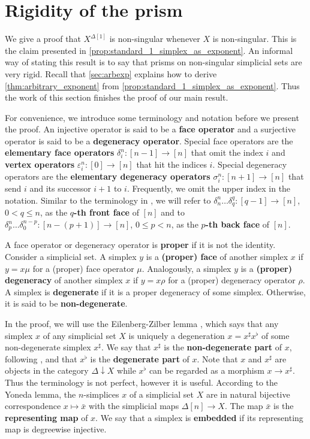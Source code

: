 

\section{Rigidity of the prism}
\label{sec:prism}

We give a proof that $X^{\Delta [1]}$ is non-singular whenever $X$ is non-singular. This is the claim presented in \cref{prop:standard_1_simplex_as_exponent}. An informal way of stating this result is to say that prisms on non-singular simplicial sets are very rigid. Recall that \cref{sec:arbexp} explains how to derive \cref{thm:arbitrary_exponent} from \cref{prop:standard_1_simplex_as_exponent}. Thus the work of this section finishes the proof of our main result.

For convenience, we introduce some terminology and notation before we present the proof. An injective operator is said to be a \textbf{face operator} and a surjective operator is said to be a \textbf{degeneracy operator}. Special face operators are the \textbf{elementary face operators} $\delta ^n_i:[n-1]\to [n]$ that omit the index $i$ and \textbf{vertex operators} $\varepsilon ^n_i:[0]\to [n]$ that hit the indices $i$. Special degeneracy operators are the \textbf{elementary degeneracy operators} $\sigma ^n_i:[n+1]\to [n]$ that send $i$ and its successor $i+1$ to $i$. Frequently, we omit the upper index in the notation. Similar to the terminology in \cite{WJR13}, we will refer to $\delta ^n_n\dots \delta ^q_q:[q-1]\to [n]$, $0<q\leq n$, as the \textbf{$q$-th front face} of $[n]$ and to $\delta ^n_p\dots \delta ^{n-p}_0:[n-(p+1)]\to [n]$, $0\leq p<n$, as the \textbf{$p$-th back face} of $[n]$.

A face operator or degeneracy operator is \textbf{proper} if it is not the identity. Consider a simplicial set. A simplex $y$ is a \textbf{(proper) face} of another simplex $x$ if $y=x\mu$ for a (proper) face operator $\mu$. Analogously, a simplex $y$ is a \textbf{(proper) degeneracy} of another simplex $x$ if $y=x\rho$ for a (proper) degeneracy operator $\rho$. A simplex is \textbf{degenerate} if it is a proper degeneracy of some simplex. Otherwise, it is said to be \textbf{non-degenerate}.

In the proof, we will use the Eilenberg-Zilber lemma \cite[Thm.~4.2.3]{FP90}, which says that any simplex $x$ of any simplicial set $X$ is uniquely a degeneration $x=x^\sharp x^\flat$ of some non-degenerate simplex $x^\sharp$. We say that $x^\sharp$ is the \textbf{non-degenerate part} of $x$, following \cite{WJR13}, and that $x^\flat$ is the \textbf{degenerate part} of $x$. Note that $x$ and $x^\sharp$ are objects in the category $\Delta \downarrow X$ while $x^\flat$ can be regarded as a morphism $x\to x^\sharp$. Thus the terminology is not perfect, however it is useful. According to the Yoneda lemma, the $n$-simplices $x$ of a simplicial set $X$ are in natural bijective correspondence $x\mapsto \bar{x}$ with the simplicial maps $\Delta [n]\to X$. The map $\bar{x}$ is the \textbf{representing map} of $x$. We say that a simplex is \textbf{embedded} if its representing map is degreewise injective.

